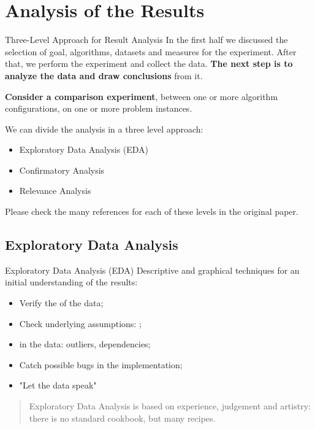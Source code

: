 \documentclass[aspectratio=169]{beamer}
\begin{document}
\section{Analysis of the Results}

\begin{frame}[t]{Three-Level Approach for Result Analysis}
  In the first half we discussed the selection of goal, algorithms, datasets and measures for the experiment. After that, we perform the experiment and collect the data. {\bf The next step is to analyze the data and draw conclusions} from it.\medskip
  
  {\bf Consider a comparison experiment}, between one or more algorithm configurations, on one or more problem instances.\medskip 

  We can divide the analysis in a three level approach:
  \begin{itemize}
    \item Exploratory Data Analysis (EDA)
    \item Confirmatory Analysis
    \item Relevance Analysis
  \end{itemize}

  \vfill 
  Please check the many references for each of these levels in the original paper.
\end{frame}

\subsection{Exploratory Data Analysis}

\begin{frame}[t]{Exploratory Data Analysis (EDA)}
  Descriptive and graphical techniques for an initial understanding of the results:
  \begin{itemize}
    \item Verify the  of the data; 
    \item Check underlying assumptions: ;
    \item {} in the data: outliers, dependencies;
    \item Catch possible bugs in the implementation;
    \item "Let the data speak"
  \end{itemize}
  \vfill 

  \begin{quote}
    Exploratory Data Analysis is based on experience, judgement and artistry: there is no standard cookbook, but many recipes.
  \end{quote}
\end{frame}
\end{document}
